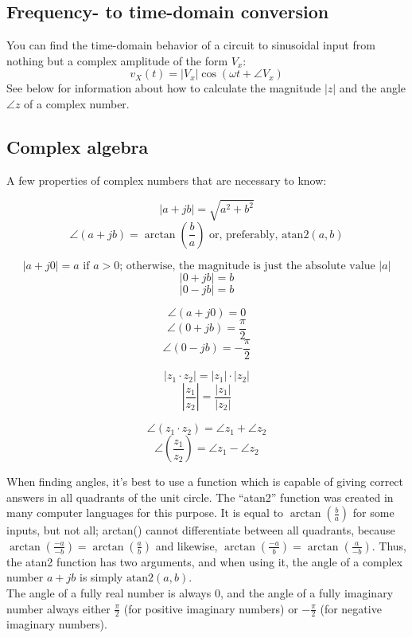 \documentclass[12pt,a4paper]{report}
\begin{document}
\subsection{Frequency- to time-domain conversion}
You can find the time-domain behavior of a circuit to sinusoidal input from nothing but a complex amplitude of the form $V_x$:
\[ v_X(t) = |V_x| \cos{(\omega t + \angle V_x)} \]
See below for information about how to calculate the magnitude $|z|$ and the angle $\angle z$ of a complex number.

\subsection{Complex algebra}
A few properties of complex numbers that are necessary to know:

\[ |a + jb| = \sqrt{a^2 + b^2} \]
\[ \angle (a + jb) = \arctan{(\frac{b}{a})} \text{ or, preferably, } \text{atan2}(a, b) \]

\[ |a + j0| = a \text { if $a > 0$; otherwise, the magnitude is just the absolute value } |a| \]
\[ |0 + jb| = b \]
\[ |0 - jb| = b \]

\[ \angle (a + j0) = 0 \]
\[ \angle (0 + jb) = \frac{\pi}{2} \]
\[ \angle (0 - jb) = -\frac{\pi}{2} \]

\[ |z_1 \cdot z_2| = |z_1| \cdot |z_2| \]
\[ \left| \frac{z_1}{z_2} \right| = \frac{|z_1|}{|z_2|} \]

\[ \angle (z_1 \cdot z_2) = \angle z_1 + \angle z_2 \]
\[ \angle \left( \frac{z_1}{z_2} \right) = \angle z_1 - \angle z_2 \]

When finding angles, it's best to use a function which is capable of giving correct answers in all quadrants of the unit circle. The ``atan2'' function was created in many computer languages for this purpose. It is equal to $\displaystyle \arctan{(\frac{b}{a})}$ for some inputs, but not all; arctan() cannot differentiate between all quadrants, because $\displaystyle \arctan{\left( \frac{-a}{-b}\right )} = \arctan{\left( \frac{a}{b}\right) }$ and likewise, $\displaystyle \arctan{\left( \frac{-a}{b}\right )} = \arctan{\left( \frac{a}{-b}\right) }$. Thus, the atan2 function has two arguments, and when using it, the angle of a complex number $a + jb$ is simply $\text{atan2}(a, b)$.\\
The angle of a fully real number is always $0$, and the angle of a fully imaginary number always either $\displaystyle \frac{\pi}{2}$ (for positive imaginary numbers) or $\displaystyle -\frac{\pi}{2}$ (for negative imaginary numbers).
\end{document}
